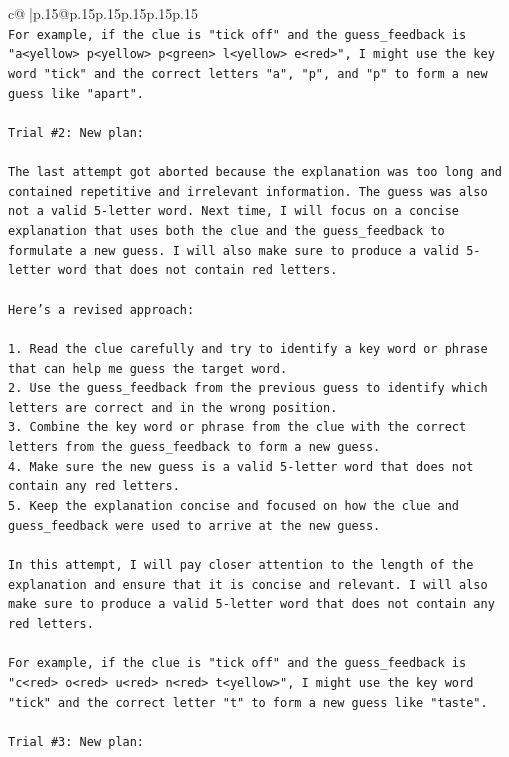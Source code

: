 \documentclass{article}
\begin{document}
{\begin{supertabular}{c@{$\;$}|p{.15\linewidth}@{}p{.15\linewidth}p{.15\linewidth}p{.15\linewidth}p{.15\linewidth}p{.15\linewidth}}
{{{\\ 
\texttt{For example, if the clue is "tick off" and the guess\_feedback is "a<yellow> p<yellow> p<green> l<yellow> e<red>", I might use the key word "tick" and the correct letters "a", "p", and "p" to form a new guess like "apart".} \\
\\ 
\texttt{Trial \#2: New plan: } \\
\\ 
\texttt{The last attempt got aborted because the explanation was too long and contained repetitive and irrelevant information. The guess was also not a valid 5{-}letter word. Next time, I will focus on a concise explanation that uses both the clue and the guess\_feedback to formulate a new guess. I will also make sure to produce a valid 5{-}letter word that does not contain red letters. } \\
\\ 
\texttt{Here's a revised approach:} \\
\\ 
\texttt{1. Read the clue carefully and try to identify a key word or phrase that can help me guess the target word.} \\
\texttt{2. Use the guess\_feedback from the previous guess to identify which letters are correct and in the wrong position.} \\
\texttt{3. Combine the key word or phrase from the clue with the correct letters from the guess\_feedback to form a new guess.} \\
\texttt{4. Make sure the new guess is a valid 5{-}letter word that does not contain any red letters.} \\
\texttt{5. Keep the explanation concise and focused on how the clue and guess\_feedback were used to arrive at the new guess.} \\
\\ 
\texttt{In this attempt, I will pay closer attention to the length of the explanation and ensure that it is concise and relevant. I will also make sure to produce a valid 5{-}letter word that does not contain any red letters. } \\
\\ 
\texttt{For example, if the clue is "tick off" and the guess\_feedback is "c<red> o<red> u<red> n<red> t<yellow>", I might use the key word "tick" and the correct letter "t" to form a new guess like "taste".} \\
\\ 
\texttt{Trial \#3: New plan: } \\
}}}
\end{supertabular}}
\end{document}
